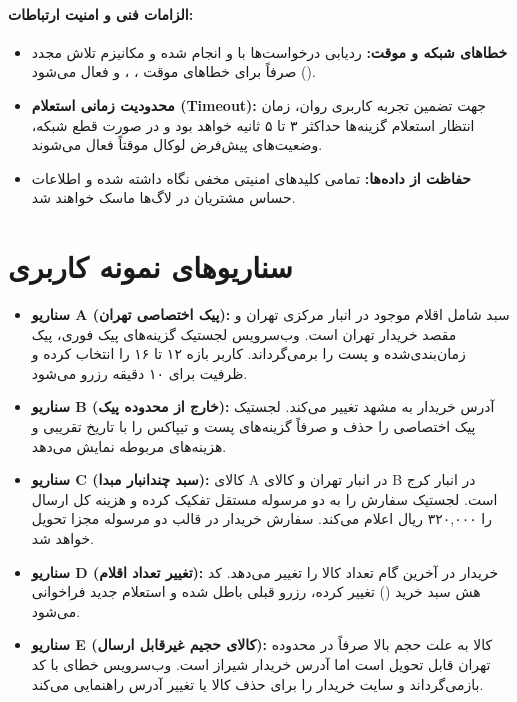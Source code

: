 \documentclass[11pt,a4paper]{article}
\begin{document}
\paragraph{الزامات فنی و امنیت ارتباطات:}
\begin{itemize}
    \item \textbf{خطاهای شبکه و موقت:} ردیابی درخواست‌ها با  و  انجام شده و مکانیزم تلاش مجدد () صرفاً برای خطاهای موقت ، ،  و  فعال می‌شود.
    \item \textbf{محدودیت زمانی استعلام (Timeout):} جهت تضمین تجربه کاربری روان، زمان انتظار استعلام گزینه‌ها حداکثر ۳ تا ۵ ثانیه خواهد بود و در صورت قطع شبکه، وضعیت‌های پیش‌فرض لوکال موقتاً فعال می‌شوند.
    \item \textbf{حفاظت از داده‌ها:} تمامی کلیدهای امنیتی مخفی نگاه داشته شده و اطلاعات حساس مشتریان در لاگ‌ها ماسک خواهند شد.
\end{itemize}

\section{سناریوهای نمونه کاربری}
\begin{itemize}
    \item \textbf{سناریو A (پیک اختصاصی تهران):} سبد شامل اقلام موجود در انبار مرکزی تهران و مقصد خریدار تهران است. وب‌سرویس لجستیک گزینه‌های پیک فوری، پیک زمان‌بندی‌شده و پست را برمی‌گرداند. کاربر بازه ۱۲ تا ۱۶ را انتخاب کرده و ظرفیت برای ۱۰ دقیقه رزرو می‌شود.
    \item \textbf{سناریو B (خارج از محدوده پیک):} آدرس خریدار به مشهد تغییر می‌کند. لجستیک پیک اختصاصی را حذف و صرفاً گزینه‌های پست و تیپاکس را با تاریخ تقریبی و هزینه‌های مربوطه نمایش می‌دهد.
    \item \textbf{سناریو C (سبد چندانبار مبدا):} کالای A در انبار تهران و کالای B در انبار کرج است. لجستیک سفارش را به دو مرسوله مستقل تفکیک کرده و هزینه کل ارسال را ۳۲۰,۰۰۰ ریال اعلام می‌کند. سفارش خریدار در قالب دو مرسوله مجزا تحویل خواهد شد.
    \item \textbf{سناریو D (تغییر تعداد اقلام):} خریدار در آخرین گام تعداد کالا را تغییر می‌دهد. کد هش سبد خرید () تغییر کرده، رزرو قبلی باطل شده و استعلام جدید فراخوانی می‌شود.
    \item \textbf{سناریو E (کالای حجیم غیرقابل ارسال):} کالا به علت حجم بالا صرفاً در محدوده تهران قابل تحویل است اما آدرس خریدار شیراز است. وب‌سرویس خطای  با کد  بازمی‌گرداند و سایت خریدار را برای حذف کالا یا تغییر آدرس راهنمایی می‌کند.
\end{itemize}
\end{document}
